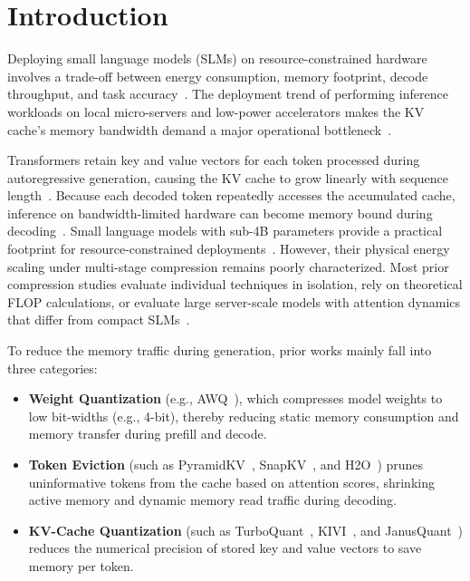 \documentclass[sigconf,nonacm]{acmart}
\begin{document}
\maketitle

\section{Introduction}

Deploying small language models (SLMs) on resource-constrained hardware involves a trade-off between energy consumption, memory footprint, decode throughput, and task accuracy~\cite{strubell_energy_2019,patterson_carbon_2021,schwartz2020green}. The deployment trend of performing inference workloads on local micro-servers and low-power accelerators makes the KV cache's memory bandwidth demand a major operational bottleneck~\cite{li2024survey}.

Transformers retain key and value vectors for each token processed during autoregressive generation, causing the KV cache to grow linearly with sequence length~\cite{li2024survey}. Because each decoded token repeatedly accesses the accumulated cache, inference on bandwidth-limited hardware can become memory bound during decoding~\cite{dao_flashattention_2022}. Small language models with sub-4B parameters provide a practical footprint for resource-constrained deployments~\cite{husom_sustainable_2025}. However, their physical energy scaling under multi-stage compression remains poorly characterized. Most prior compression studies evaluate individual techniques in isolation, rely on theoretical FLOP calculations, or evaluate large server-scale models with attention dynamics that differ from compact SLMs~\cite{wang_slmquant_2025}.

To reduce the memory traffic during generation, prior works mainly fall into three categories:
\begin{itemize}\raggedright
  \item \textbf{Weight Quantization} (e.g., AWQ~\cite{lin_awq_2025}), which compresses model weights to low bit-widths (e.g., 4-bit), thereby reducing static memory consumption and memory transfer during prefill and decode.
  \item \textbf{Token Eviction} (such as PyramidKV~\cite{cai_pyramidkv_2025}, SnapKV~\cite{li_snapkv_2024}, and H2O~\cite{zhang_h2o_2023}) prunes uninformative tokens from the cache based on attention scores, shrinking active memory and dynamic memory read traffic during decoding.
  \item \textbf{KV-Cache Quantization} (such as TurboQuant~\cite{zandieh2026turboquant}, KIVI~\cite{liu_kivi_2023}, and JanusQuant~\cite{sun2026janusquant}) reduces the numerical precision of stored key and value vectors to save memory per token.
\end{itemize}
\end{document}
